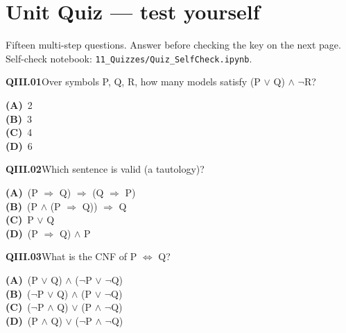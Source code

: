 \section{Unit Quiz --- test yourself}
{\small\color{slate}Fifteen multi-step questions. Answer before checking the key on the next page. Self-check notebook: \texttt{11\_Quizzes/Quiz\_SelfCheck.ipynb}.}\par\medskip
\begin{tcolorbox}[enhanced,breakable,colback=white,colframe=navyL,arc=2mm,boxrule=0.7pt,left=3mm,right=3mm,top=2mm,bottom=2mm]
\textbf{\color{navy}QIII.01}\quad Over symbols P, Q, R, how many models satisfy (P $\vee$ Q) $\wedge$ $\neg$R?\hfill{}\par\smallskip
{\small \textbf{\color{navyL}(A)}\ 2\\[1pt]\textbf{\color{navyL}(B)}\ 3\\[1pt]\textbf{\color{navyL}(C)}\ 4\\[1pt]\textbf{\color{navyL}(D)}\ 6}
\end{tcolorbox}
\begin{tcolorbox}[enhanced,breakable,colback=white,colframe=navyL,arc=2mm,boxrule=0.7pt,left=3mm,right=3mm,top=2mm,bottom=2mm]
\textbf{\color{navy}QIII.02}\quad Which sentence is valid (a tautology)?\hfill{}\par\smallskip
{\small \textbf{\color{navyL}(A)}\ (P $\Rightarrow$ Q) $\Rightarrow$ (Q $\Rightarrow$ P)\\[1pt]\textbf{\color{navyL}(B)}\ (P $\wedge$ (P $\Rightarrow$ Q)) $\Rightarrow$ Q\\[1pt]\textbf{\color{navyL}(C)}\ P $\vee$ Q\\[1pt]\textbf{\color{navyL}(D)}\ (P $\Rightarrow$ Q) $\wedge$ P}
\end{tcolorbox}
\begin{tcolorbox}[enhanced,breakable,colback=white,colframe=navyL,arc=2mm,boxrule=0.7pt,left=3mm,right=3mm,top=2mm,bottom=2mm]
\textbf{\color{navy}QIII.03}\quad What is the CNF of P $\Leftrightarrow$ Q?\hfill{}\par\smallskip
{\small \textbf{\color{navyL}(A)}\ (P $\vee$ Q) $\wedge$ ($\neg$P $\vee$ $\neg$Q)\\[1pt]\textbf{\color{navyL}(B)}\ ($\neg$P $\vee$ Q) $\wedge$ (P $\vee$ $\neg$Q)\\[1pt]\textbf{\color{navyL}(C)}\ ($\neg$P $\wedge$ Q) $\vee$ (P $\wedge$ $\neg$Q)\\[1pt]\textbf{\color{navyL}(D)}\ (P $\wedge$ Q) $\vee$ ($\neg$P $\wedge$ $\neg$Q)}
\end{tcolorbox}
